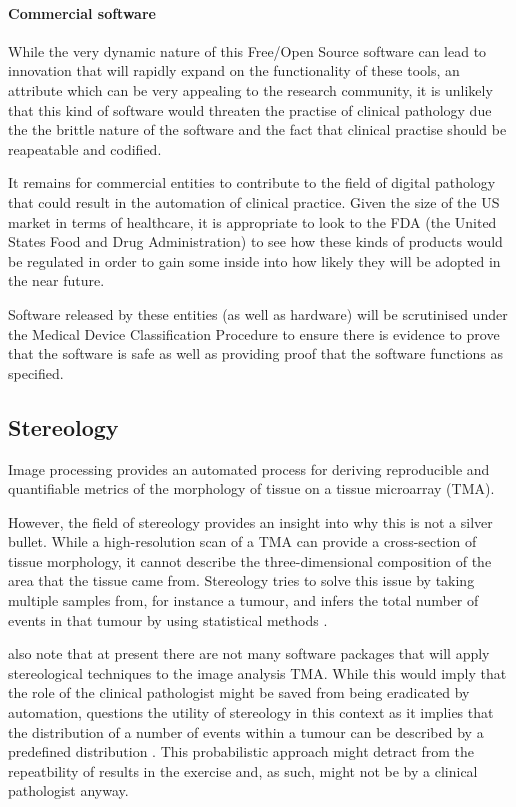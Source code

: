 \documentclass[12pt]{article}
\begin{document}
\paragraph{Commercial software}
While the very dynamic nature of this Free/Open Source software can lead to innovation that will rapidly expand on the 
functionality of these tools, an attribute which can be very appealing to the research community, it is unlikely that
this kind of software would threaten the practise of clinical pathology due the the brittle nature of the software and
the fact that clinical practise should be reapeatable and codified.

It remains for commercial entities to contribute to the field of digital pathology that could result in the automation of
clinical practice. Given the size of the US market in terms of healthcare, it is appropriate to look to the FDA (the
United States Food and Drug Administration) to see how these kinds of products would be regulated in order to gain some
inside into how likely they will be adopted in the near future.

Software released by these entities (as well as hardware) will be scrutinised under the Medical Device Classification
Procedure \parencite{fdadevices} to ensure there is evidence to prove that the software is safe as well as providing
proof that the software functions as specified.



\subsection{Stereology}
Image processing provides an automated process for deriving reproducible and quantifiable metrics of the 
morphology of tissue on a tissue microarray (TMA).

However, the field of stereology provides an insight into why this is not a silver bullet. While a high-resolution 
scan of a TMA can provide a cross-section of tissue morphology, it cannot describe the three-dimensional 
composition of the area that the tissue came from. Stereology tries to solve this issue by taking multiple samples 
from, for instance a tumour, and infers the total number of events in that tumour by using statistical methods 
\parencite{webster2014whole}.

\citeauthor{webster2014whole} also note that at present there are not many software packages that will apply 
stereological techniques to the image analysis TMA. While this would imply that the role of the clinical pathologist 
might be saved from being eradicated by automation, \citeauthor{suvarna2013bancroft} questions the utility of 
stereology in this context as it implies that the distribution of a number of events within a tumour can be described 
by a predefined distribution \parencite[p.~540, Ch.~23.]{suvarna2013bancroft}. This probabilistic approach might 
detract from the repeatbility of results in the exercise and, as such, might not be by a clinical pathologist anyway.
\end{document}
